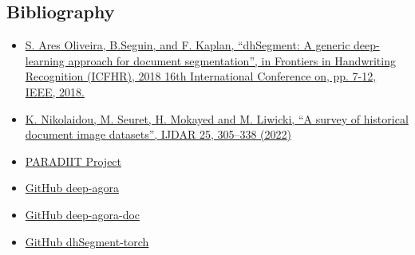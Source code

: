 \documentclass{polytech/polytech}
\numberwithin{figure}{chapter}
\begin{document}
\begin{appendix}
\chapter{Bibliography}

\begin{itemize}
\item \href{https://arxiv.org/abs/1804.10371}{S. Ares Oliveira, B.Seguin, and F. Kaplan, “dhSegment: A generic deep-learning approach for document segmentation”, in Frontiers in Handwriting Recognition (ICFHR), 2018 16th International Conference on, pp. 7-12, IEEE, 2018.}
\item \href{https://arxiv.org/abs/2203.08504}{K. Nikolaidou, M. Seuret, H. Mokayed and M. Liwicki, “A survey of historical document image datasets”, IJDAR 25, 305–338 (2022)}
\item \href{https://sites.google.com/site/paradiitproject/}{PARADIIT Project}
\item \href{https://github.com/theo-boi/deep-agora}{GitHub deep-agora}
\item \href{https://github.com/theo-boi/deep-agora-doc}{GitHub deep-agora-doc}
\item \href{https://github.com/dhlab-epfl/dhSegment-torch}{GitHub dhSegment-torch}
\end{itemize}



\end{appendix}
\end{document}
